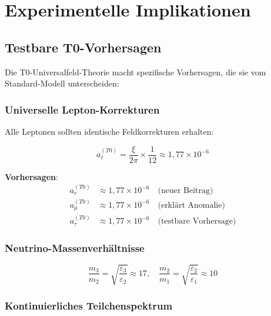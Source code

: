 \documentclass[12pt,a4paper]{article}
\newcommand{\xipar}{\xi}
\begin{document}
	\section{Experimentelle Implikationen}
	
	\subsection{Testbare T0-Vorhersagen}
	
	Die T0-Universalfeld-Theorie macht spezifische Vorhersagen, die sie vom Standard-Modell unterscheiden:
	
	\subsubsection{Universelle Lepton-Korrekturen}
	
	Alle Leptonen sollten identische Feldkorrekturen erhalten:
	
	\begin{equation}
		a_\ell^{(T0)} = \frac{\xipar}{2\pi} \times \frac{1}{12} \approx 1{,}77 \times 10^{-6}
		\label{eq:universal_lepton_correction}
	\end{equation}
	
	\textbf{Vorhersagen}:
	\begin{align}
		a_e^{(T0)} &\approx 1{,}77 \times 10^{-6} \quad \text{(neuer Beitrag)} \\
		a_\mu^{(T0)} &\approx 1{,}77 \times 10^{-6} \quad \text{(erklärt Anomalie)} \\
		a_\tau^{(T0)} &\approx 1{,}77 \times 10^{-6} \quad \text{(testbare Vorhersage)}
	\end{align}
	
	\subsubsection{Neutrino-Massenverhältnisse}
	
	\begin{equation}
		\frac{m_3}{m_2} = \sqrt{\frac{\varepsilon_3}{\varepsilon_2}} \approx 17, \quad \frac{m_2}{m_1} = \sqrt{\frac{\varepsilon_2}{\varepsilon_1}} \approx 10
		\label{eq:neutrino_mass_ratios}
	\end{equation}
	
	\subsubsection{Kontinuierliches Teilchenspektrum}
	
\end{document}
